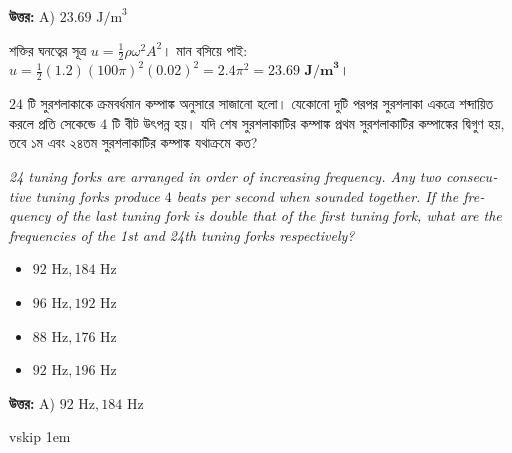 \documentclass[12pt, a4paper]{article}
\begin{document}
\vspace{0.5em}
\begin{tcolorbox}[answerbox]
    \textbf{\color{success} উত্তর:} A) $23.69\text{ J/m}^3$
\end{tcolorbox}
\vspace{1em}

\begin{tcolorbox}[solutionbox={সমাধান (Solution)}]
    \noindent
    শক্তির ঘনত্বের সূত্র $u = \frac{1}{2} \rho \omega^2 A^2$। মান বসিয়ে পাই: $u = \frac{1}{2} (1.2) (100\pi)^2 (0.02)^2 = 2.4\pi^2 = \mathbf{23.69\text{ J/m}^3}$।
\end{tcolorbox}
\begin{tcolorbox}[questionbox={প্রশ্ন (Question) 16}]
    \noindent
    $24$ টি সুরশলাকাকে ক্রমবর্ধমান কম্পাঙ্ক অনুসারে সাজানো হলো। যেকোনো দুটি পরপর সুরশলাকা একত্রে শব্দায়িত করলে প্রতি সেকেন্ডে $4$ টি বীট উৎপন্ন হয়। যদি শেষ সুরশলাকাটির কম্পাঙ্ক প্রথম সুরশলাকাটির কম্পাঙ্কের দ্বিগুণ হয়, তবে ১ম এবং ২৪তম সুরশলাকাটির কম্পাঙ্ক যথাক্রমে কত?
    
    \vspace{0.8em}
    \begin{english}
    \noindent\textit{\color{darkgray}
    24 tuning forks are arranged in order of increasing frequency. Any two consecutive tuning forks produce $4$ beats per second when sounded together. If the frequency of the last tuning fork is double that of the first tuning fork, what are the frequencies of the 1st and 24th tuning forks respectively?
    }
    \end{english}
\end{tcolorbox}

\begin{itemize}[label={}, leftmargin=1cm, itemsep=0.5em]
    \item[\textbf{A)}] $92\text{ Hz}, 184\text{ Hz}$
    \item[\textbf{B)}] $96\text{ Hz}, 192\text{ Hz}$
    \item[\textbf{C)}] $88\text{ Hz}, 176\text{ Hz}$
    \item[\textbf{D)}] $92\text{ Hz}, 196\text{ Hz}$
\end{itemize}

\vspace{0.5em}
\begin{tcolorbox}[answerbox]
    \textbf{\color{success} উত্তর:} A) $92\text{ Hz}, 184\text{ Hz}$
\end{tcolorbox}
vskip 1em
\end{document}
